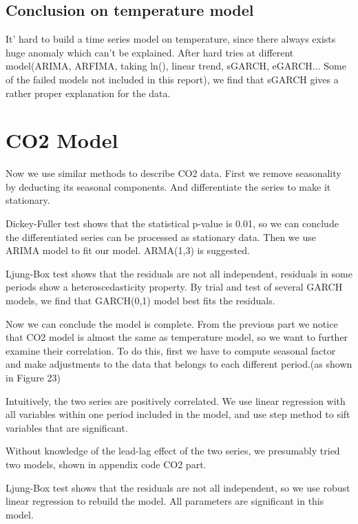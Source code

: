 \documentclass[a4paper,11pt]{article}
\begin{document}
\subsection{Conclusion on temperature model}
It' hard to build a time series model on temperature, since there always exists huge anomaly which can't be explained. After hard tries at different model(ARIMA, ARFIMA, taking ln(), linear trend, sGARCH, eGARCH... Some of the failed models not included in this report), we find that sGARCH gives a rather proper explanation for the data. 




\newpage



\section{CO2 Model}
Now we use similar methods to describe CO2 data. First we remove seasonality by deducting its seasonal components. And differentiate the series to make it stationary.\par
Dickey-Fuller test shows that the statistical p-value is 0.01, so we can conclude the differentiated series can be processed as stationary data. Then we use ARIMA model to fit our model. ARMA(1,3) is suggested.\par
Ljung-Box test shows that the residuals are not all independent, residuals in some periods show a heteroscedasticity property. By trial and test of several GARCH models, we find that GARCH(0,1) model best fits the residuals.\par
Now we can conclude the model is complete. From the previous part we notice that CO2 model is almost the same as temperature model, so we want to further examine their correlation. To do this, first we have to compute seasonal factor and make adjustments to the data that belongs to each different period.(as shown in Figure 23)\par
Intuitively, the two series are positively correlated. We use linear regression with all variables within one period included in the model, and use step method to sift variables that are significant.\par
Without knowledge of the lead-lag effect of the two series, we presumably tried two models, shown in appendix code CO2 part.\par
Ljung-Box test shows that the residuals are not all independent, so we use robust linear regression to rebuild the model. All parameters are significant in this model.\par
\end{document}
